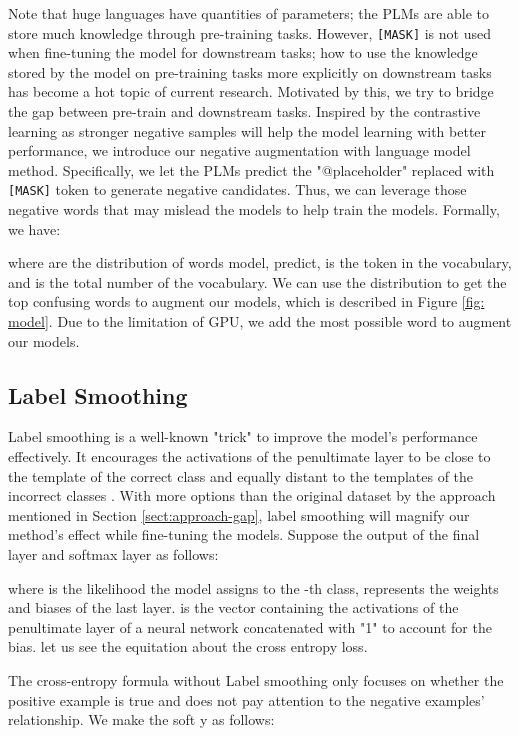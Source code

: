 \documentclass[11pt,a4paper]{article}
\begin{document}
Note that huge languages have quantities of parameters; the PLMs are able to store much knowledge through pre-training tasks. 
However, \texttt{[MASK]} is not used when fine-tuning the model for downstream tasks; how to use the knowledge stored by the model on pre-training tasks more explicitly on downstream tasks has become a hot topic of current research.
Motivated by this, we try to bridge the gap between pre-train and downstream tasks.
Inspired by the contrastive learning \cite{DBLP:conf/icml/ChenK0H20,DBLP:journals/corr/abs-2010-04592} as stronger negative samples will help the model learning with better performance, we introduce our negative augmentation with language model method.
Specifically,  we let the PLMs predict the "@placeholder" replaced with \texttt{[MASK]} token to generate negative candidates.
Thus, we can leverage those negative words that may mislead the models to help train the models. Formally, we have:

where  are the distribution of words model, predict,  is the token in the vocabulary, and  is the total number of the vocabulary.
We can use the distribution to get the top confusing words to augment our models, which is described in Figure \ref{fig: model}.
Due to the limitation of GPU, we add the most possible word to augment our models.

\subsection{Label Smoothing}
\label{sec_label}
Label smoothing is a well-known "trick" to improve the model's performance effectively. 
It encourages the activations of the penultimate layer to be close to the template of the correct class and equally distant to the templates of the incorrect classes \cite{muller_when_2020}. 
With more options than the original dataset by the approach mentioned in Section \ref{sect:approach-gap}, label smoothing will magnify our method's effect while fine-tuning the models.
Suppose the output of the final layer and softmax layer as follows:

where  is the likelihood the model assigns to the -th class,  represents the weights and biases of the last layer.
 is the vector containing the activations of the penultimate layer of a neural network concatenated with "1" to account for the bias.
let us see the equitation about the  cross entropy loss.



The cross-entropy formula without Label smoothing only focuses on whether the positive example is true and does not pay attention to the negative examples' relationship.
We make the soft y as follows:
\end{document}
